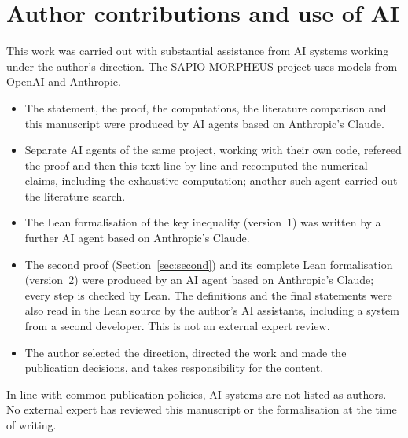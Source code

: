 \documentclass[11pt]{amsart}
\theoremstyle{plain}
\theoremstyle{remark}
\begin{document}
\section*{Author contributions and use of AI}
This work was carried out with substantial assistance from AI systems working under the author's direction. The
SAPIO MORPHEUS project uses models from OpenAI and Anthropic.
\begin{itemize}
\item The statement, the proof, the computations, the literature comparison and this manuscript were produced by AI
  agents based on Anthropic's Claude.
\item Separate AI agents of the same project, working with their own code, refereed the proof and then this text
  line by line and recomputed the numerical claims, including the exhaustive computation; another such agent
  carried out the literature search.
  
\item The Lean formalisation of the key inequality (version~1) was written by a further AI agent based on
  Anthropic's Claude.
\item The second proof (Section~\ref{sec:second}) and its complete Lean formalisation (version~2) were produced
  by an AI agent based on Anthropic's Claude; every step is checked by Lean. The definitions and the final
  statements were also read in the Lean source by the author's AI assistants, including a system from a second
  developer. This is not an external expert review.
\item The author selected the direction, directed the work and made the publication decisions, and takes
  responsibility for the content.
\end{itemize}
In line with common publication policies, AI systems are not listed as authors. No external expert has reviewed
this manuscript or the formalisation at the time of writing.
\end{document}
